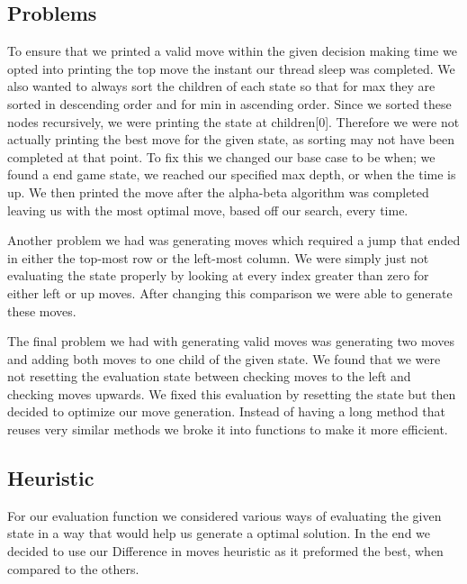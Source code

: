 \documentclass[12pt]{article}
\begin{document}
\subsection*{Problems}
To ensure that we printed a valid move within the given decision making time we opted into printing the top move the instant our thread sleep was completed.
We also wanted to always sort the children of each state so that for max they are sorted in descending order and for min in ascending order.
Since we sorted these nodes recursively, we were printing the state at children[0].
Therefore we were not actually printing the best move for the given state, as sorting may not have been completed at that point.
To fix this we changed our base case to be when; we found a end game state, we reached our specified max depth, or when the time is up.
We then printed the move after the alpha-beta algorithm was completed leaving us with the most optimal move, based off our search,  every time.

Another problem we had was generating moves which required a jump that ended in either the top-most row or the left-most column.
We were simply just not evaluating the state properly by looking at every index greater than zero for either left or up moves.
After changing this comparison we were able to generate these moves.
 
The final problem we had with generating valid moves was generating two moves and adding both moves to one child of the given state.
We found that we were not resetting the evaluation state between checking moves to the left and checking moves upwards.
We fixed this evaluation by resetting the state but then decided to optimize our move generation.
Instead of having a long method that reuses very similar methods we broke it into functions to make it more efficient.

\subsection*{Heuristic}
For our evaluation function we considered various ways of evaluating the given state in a way that would help us generate a optimal solution.
In the end we decided to use our Difference in moves heuristic as it preformed the best, when compared to the others.
\end{document}

